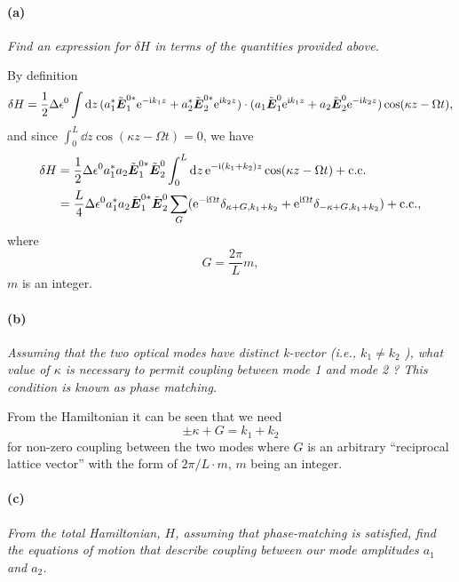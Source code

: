 \documentclass[hyperref, a4paper]{article}
\newcommand*{\ii}{\mathrm{i}}
\newcommand*{\ee}{\mathrm{e}}
\newcommand*{\mvb}[1]{\tilde{\vb*{#1}}}
\begin{document}
\paragraph*{(a)} \textit{Find an expression for $\delta H$ in terms of the quantities provided above.} 

By definition 
\[
    \var{H} = \frac{1}{2} \Delta \epsilon^0 \int \dd{z} 
    (a_1^* \mvb{E}_1^{0*} \ee^{- \ii k_1 z} + a_2^* \mvb{E}_2^{0*} \ee^{\ii k_2 z}) 
    \cdot (a_1 \mvb{E}_1^0 \ee^{\ii k_1 z} + a_2 \mvb{E}_2^0 \ee^{- \ii k_2 z}) \cos(\kappa z - \Omega t),
\]
and since $\int_0^L \dd{z} \cos(\kappa z - \Omega t) = 0$, we have 
\begin{equation}
    \begin{aligned}
        \var{H} &= \frac{1}{2} \Delta \epsilon^0 a_1^* a_2 \mvb{E}_1^{0*} \mvb{E}_2^0 
        \int_0^L \dd{z} \ee^{-\ii (k_1 + k_2) z} \cos(\kappa z - \Omega t) + \text{c.c.} \\
        &= \frac{L}{4} \Delta \epsilon^0 a_1^* a_2 \mvb{E}_1^{0*} \mvb{E}_2^0 
        \sum_G (\ee^{- \ii \Omega t} \delta_{\kappa + G, k_1 + k_2} + \ee^{\ii \Omega t} \delta_{-\kappa + G, k_1+k_2}) + \text{c.c.},
    \end{aligned}
\end{equation}
where 
\begin{equation}
    G = \frac{2\pi}{L} m, 
\end{equation}
$m$ is an integer.

\paragraph*{(b)} \textit{Assuming that the two optical modes have distinct k-vector (i.e., $k_1 \neq k_2$ ), what value of $\kappa$ is necessary to permit coupling between mode 1 and mode 2 ? This condition is known as phase matching.} 

From the Hamiltonian it can be seen that we need 
\begin{equation}
    \pm \kappa + G = k_1 + k_2
\end{equation}
for non-zero coupling between the two modes where $G$ is an arbitrary ``reciprocal lattice vector''
with the form of $2\pi / L \cdot m$, $m$ being an integer.

\paragraph*{(c)} \textit{From the total Hamiltonian, $H$, assuming that phase-matching is satisfied, find the equations of motion that describe coupling between our mode amplitudes $a_1$ and $a_2$.} 
\end{document}
